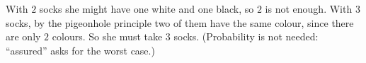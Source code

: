 With $2$ socks she might have one white and one black, so $2$ is not enough. With $3$ socks, by the pigeonhole principle two of them have the same colour, since there are only $2$ colours. So she must take $\boxed{3}$ socks. (Probability is not needed: ``assured'' asks for the worst case.)
